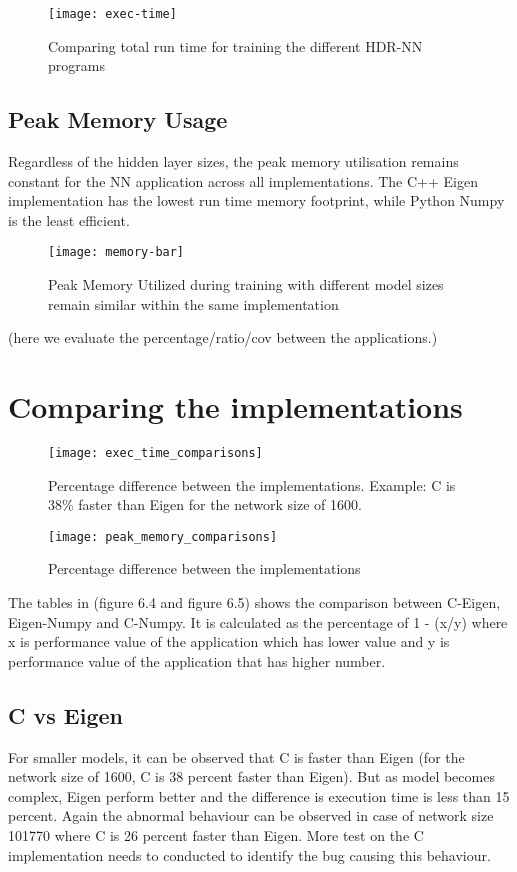 \begin{figure}[!ht]
	\centering
	\texttt{[image: exec-time]}
	\caption[Execution Time vs Model Parameters]{Comparing total run time for training the different HDR-NN programs}
\end{figure}

\subsection{Peak Memory Usage}
Regardless of the hidden layer sizes, the peak memory utilisation remains constant for the NN application across all implementations. The C++ Eigen implementation has the lowest run time memory footprint, while Python Numpy is the least efficient.

\begin{figure}[!ht]
	\centering
	\texttt{[image: memory-bar]}
	\caption[Peak Memory Utilisation]{Peak Memory Utilized during training with different model sizes remain similar within the same implementation}
\end{figure}

(here we evaluate the percentage/ratio/cov between the applications.)

\section{Comparing the implementations}

\begin{figure}[!ht]
	\centering
	\texttt{[image: exec\_time\_comparisons]}
	\caption[Execution Time vs Model Parameters]{Percentage difference between the implementations. Example: C is 38\% faster than Eigen for the network size of 1600.}
\end{figure}


\begin{figure}[ht]
	\centering
	\texttt{[image: peak\_memory\_comparisons]}
	\caption[Peak Memory Utilisation]{Percentage difference between the implementations}
\end{figure}

The tables in (figure 6.4 and figure 6.5) shows the comparison between C-Eigen, Eigen-Numpy and C-Numpy. It is calculated as the percentage of 1 - (x/y) where x is performance value of the application which has lower value and y is performance value of the application that has higher number. 

\subsection{C vs Eigen}
For smaller models, it can be observed that C is faster than Eigen (for the network size of 1600, C is 38 percent faster than Eigen). But as model becomes complex, Eigen perform better and the difference is execution time is less than 15 percent. Again the abnormal behaviour can be observed in case of network size 101770 where C is 26 percent faster than Eigen. More test on the C implementation needs to conducted to identify the bug causing this behaviour.

